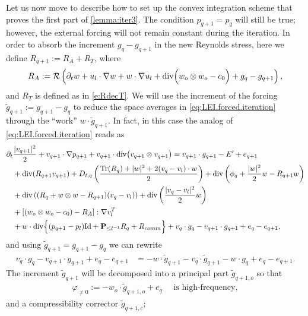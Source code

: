 \documentclass[10pt,a4paper]{amsart}
\numberwithin{equation}{section}
\numberwithin{corollario}{section}
\numberwithin{lemma}{section}
\numberwithin{prop}{section}
\theoremstyle{definition}
\theoremstyle{remark}
\renewcommand{\P}{\mathbf{P}}
\newcommand{\dvg}{\mathord{{\rm div}}}
\newcommand{\Id}{\mathrm{Id}}
\DeclareMathOperator{\Tr}{Tr}
\newcommand{\qq}{_{q+1}}
\begin{document}
Let us now move to describe how to set up the convex integration scheme that proves the first part of \autoref{lemma:iter3}. 
The condition $p\qq = p_q$ will still be true; however, the external forcing will not remain constant during the iteration. 
In order to absorb the increment $g_q-g\qq$ in the new Reynolds stress, here we define $R\qq := R_A + R_T$, where
\begin{align}\label{eq:RAnew}
    R_A := \mathcal{R} \left( 
    \partial_t w+u_l\cdot \nabla w+w\cdot \nabla u_l +\dvg\Big(w_o\otimes w_o-c_0 \Big)
    +g_q-g\qq
    \right) ,
\end{align}
and $R_T$ is defined as in \eqref{e:RdecT}.
We will use the increment of the forcing $\tilde{g}\qq := g\qq-g_q$ to reduce the space averages in \eqref{eq:LEI.forced.iteration} through the ``work'' $w \cdot \tilde{g}\qq$. 
In fact, in this case the analog of \eqref{eq:LEI.forced.iteration} reads as
   \begin{align}\label{eq:LEI.forced.iteration2}
        \partial_t&\frac{|v\qq|^2}{2}
        +
        v\qq\cdot \nabla p\qq
        +
        v\qq \cdot\dvg\big(v\qq\otimes v\qq\big) 
        =
        v\qq \cdot g\qq -E' +e\qq 
        \\
        &+\dvg(R\qq v\qq)
        +D_{t,q}\left(\frac{\Tr(R_q)+|w|^2+2(v_q-v_l)\cdot w}{2}\right)+\dvg\left(\phi_q+\frac{|w|^2}{2}w-R\qq w\right)
        \\
        &+\dvg\left((R_q+w \otimes w -R\qq)(v_q-v_l)  
    \right)
    +
    \dvg\left(\frac{|v_q-v_l|^2}{2}w\right)
        \\
        &+\left[(w_o \otimes w_o-c_0)-R_A\right]:\nabla v_l^T
        \\
        &+
        w\cdot\dvg\Big\{(p\qq-p_l)\Id+\P_{\leq l^{-1}}R_q
        +
        R_{comm} \Big\}
       +v_q \cdot g_q -v\qq \cdot g\qq 
       +e_q - e\qq,
    \end{align} 
and using $\tilde{g}_{q+1} = g\qq-g_q$ we can rewrite
\begin{align} 
       v_q \cdot g_q -v\qq \cdot g\qq 
       +e_q - e\qq
       &=
       -w \cdot \tilde{g}_{q+1} - v_q \cdot \tilde{g}_{q+1}- w \cdot {g}_{q}
      +e_q-e\qq.
   \end{align} 
The increment $\tilde{g}\qq$ will be decomposed into a principal part $\tilde{g}_{q+1,o}$ so that 
\begin{align}
  \varphi_{\neq 0} := -w_o \cdot \tilde{g}_{q+1,o}+e_q
  \quad
  \mbox{ is high-frequency},
\end{align}
and a compressibility corrector $\tilde{g}_{q+1,c}$;
\end{document}
